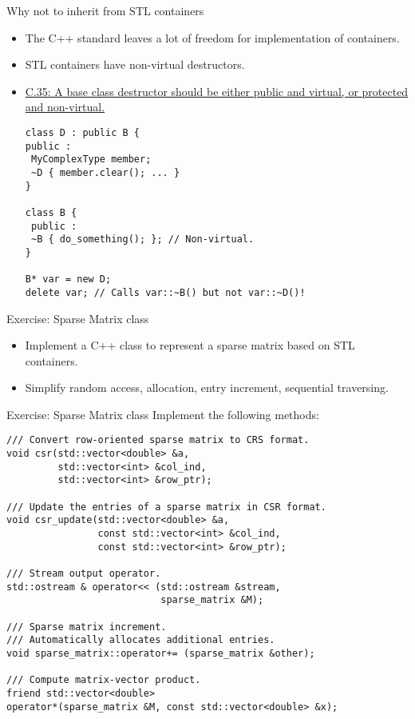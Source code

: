 \documentclass[10pt]{beamer}
\begin{document}
\begin{frame}[fragile]{Why not to inherit from STL containers}
\begin{itemize}
\item The C++ standard leaves a lot of freedom for implementation of containers.
\item STL containers have non-virtual destructors.
\item \href{http://isocpp.github.io/CppCoreGuidelines/CppCoreGuidelines\#Rc-dtor-virtual}{C.35: A base class destructor should be either public and virtual, or protected and non-virtual.}
\small\begin{lstlisting}
class D : public B {
public :
 MyComplexType member;
 ~D { member.clear(); ... }
}

class B {
 public :
 ~B { do_something(); }; // Non-virtual.
}

B* var = new D;
delete var; // Calls var::~B() but not var::~D()!
\end{lstlisting}\normalsize
\end{itemize}
\end{frame}


\begin{frame}[fragile]{Exercise: Sparse Matrix class}
\begin{itemize}
\item Implement a C++ class to represent a sparse matrix based on STL containers.
\item Simplify random access, allocation, entry increment, sequential traversing.
\end{itemize}
\end{frame}


\begin{frame}[fragile]{Exercise: Sparse Matrix class}
Implement the following methods:
\begin{lstlisting}[basicstyle=\footnotesize]
/// Convert row-oriented sparse matrix to CRS format.
void csr(std::vector<double> &a,
         std::vector<int> &col_ind,
         std::vector<int> &row_ptr);

/// Update the entries of a sparse matrix in CSR format.
void csr_update(std::vector<double> &a,
                const std::vector<int> &col_ind,
                const std::vector<int> &row_ptr);

/// Stream output operator.
std::ostream & operator<< (std::ostream &stream,
                           sparse_matrix &M);

/// Sparse matrix increment.
/// Automatically allocates additional entries.
void sparse_matrix::operator+= (sparse_matrix &other);

/// Compute matrix-vector product.
friend std::vector<double>
operator*(sparse_matrix &M, const std::vector<double> &x);
\end{lstlisting}
\end{frame}
  
\end{document}
